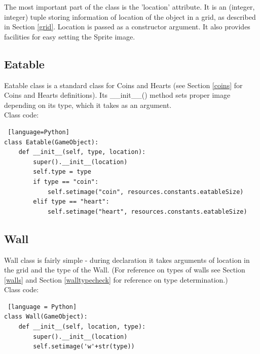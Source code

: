 \documentclass[11pt,a4paper]{report}
\newcommand{\dsubsection}[1]{\FloatBarrier \subsection{#1}}
\begin{document}
				The most important part of the class is the 'location' attribute. It is an (integer, integer) tuple storing information of location of the object in a grid, as described in Section \ref{grid}. Location is passed as a constructor argument. It also provides facilities for easy setting the Sprite image.
			\dsubsection{Eatable}
				Eatable class is a standard class for Coins and Hearts (see Section \ref{coins} for Coins and Hearts definitions).
				Its \_\_init\_\_() method sets proper image depending on its type, which it takes as an argument.\\
				Class code:
				\begin{lstlisting} [language=Python]
class Eatable(GameObject):
	def __init__(self, type, location):
		super().__init__(location)
		self.type = type
		if type == "coin":
			self.setimage("coin", resources.constants.eatableSize)
		elif type == "heart":
			self.setimage("heart", resources.constants.eatableSize)
				\end{lstlisting}
			\dsubsection{Wall}
				Wall class is fairly simple - during declaration it takes arguments of location in the grid and the type of the Wall. (For reference on types of walls see Section \ref{walls} and Section \ref{walltypecheck} for reference on type determination.)\\
				Class code:
				\begin{lstlisting} [language = Python] 
class Wall(GameObject):
	def __init__(self, location, type):
		super().__init__(location)
		self.setimage('w'+str(type))
				\end{lstlisting}
\end{document}
